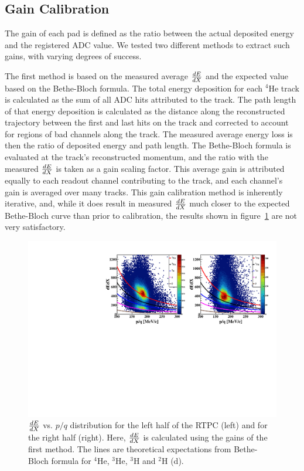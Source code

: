 \documentclass[twocolumn,showpacs,superscriptaddress,groupedaddress]{revtex4}
\begin{document}
\subsection{Gain Calibration}

The gain of each pad is defined as the ratio between the actual 
deposited energy and the registered ADC value. We tested two different 
methods to extract such gains, with varying degrees of success.

The first method is based on the measured average $\small{\frac{dE}{dX}}$
and the expected value based on the Bethe-Bloch formula. The total energy
deposition for each $^4$He track is calculated as the sum of all ADC hits
attributed to the track. The path length of that energy deposition is
calculated as the distance along the reconstructed trajectory between the first
and last hits on the track and corrected to account for regions
of bad channels along the track. The measured average energy loss is then the
ratio of deposited energy and path length. The Bethe-Bloch formula is
evaluated at the track's reconstructed momentum, and the ratio with the measured
$\small{\frac{dE}{dX}}$ is taken as a gain scaling factor. This average gain is
attributed equally to each readout channel contributing to the track, and each
channel's gain is averaged over many tracks. This gain calibration method is
inherently iterative, and, while it does result in measured $\small{\frac{dE}{dX}}$
much closer to the expected Bethe-Bloch curve than prior to calibration, the
results shown in figure~\ref{fig:dedx_p_exp_1st} are not very satisfactory.

\begin{figure}[tb]
   \centering
   \includegraphics[scale=0.45]{fig/f_dedx_p_exp_1st.pdf}
   \caption{$\small{\frac{dE}{dX}}$ vs. $p/q$ distribution for the left half of 
      the RTPC (left) and for the right half (right). Here, 
      $\small{\frac{dE}{dX}}$ is calculated using the gains of the first 
      method.  The lines are theoretical expectations from Bethe-Bloch formula 
   for $^4$He, $^3$He, $^3$H and $^2$H (d).}
\label{fig:dedx_p_exp_1st}
\end{figure}
\end{document}
